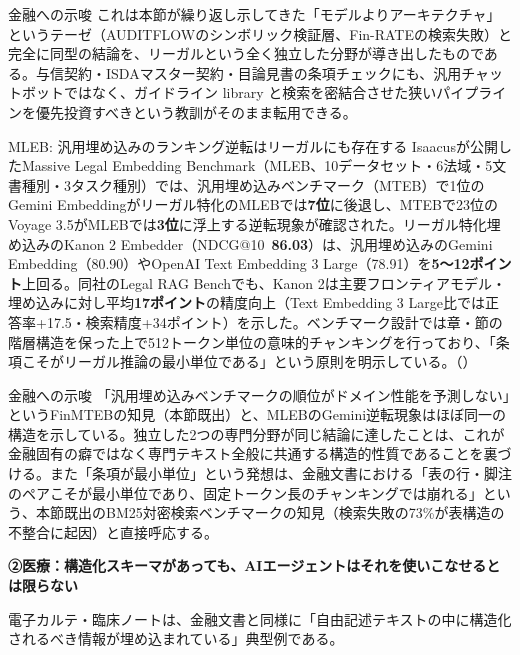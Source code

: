 \begin{insight}{金融への示唆}
これは本節が繰り返し示してきた「モデルよりアーキテクチャ」というテーゼ（AUDITFLOWのシンボリック検証層、Fin-RATEの検索失敗）と完全に同型の結論を、リーガルという全く独立した分野が導き出したものである。与信契約・ISDAマスター契約・目論見書の条項チェックにも、汎用チャットボットではなく、ガイドライン library と検索を密結合させた狭いパイプラインを優先投資すべきという教訓がそのまま転用できる。
\end{insight}

\begin{casestudy}{MLEB: 汎用埋め込みのランキング逆転はリーガルにも存在する}
Isaacusが公開したMassive Legal Embedding Benchmark（MLEB、10データセット・6法域・5文書種別・3タスク種別）では、汎用埋め込みベンチマーク（MTEB）で1位のGemini Embeddingがリーガル特化のMLEBでは\textbf{7位}に後退し、MTEBで23位のVoyage 3.5がMLEBでは\textbf{3位}に浮上する逆転現象が確認された。リーガル特化埋め込みのKanon 2 Embedder（NDCG@10\ \textbf{86.03}）は、汎用埋め込みのGemini Embedding（80.90）やOpenAI Text Embedding 3 Large（78.91）を\textbf{5〜12ポイント}上回る。同社のLegal RAG Benchでも、Kanon 2は主要フロンティアモデル・埋め込みに対し平均\textbf{17ポイント}の精度向上（Text Embedding 3 Large比では正答率+17.5・検索精度+34ポイント）を示した。ベンチマーク設計では章・節の階層構造を保った上で512トークン単位の意味的チャンキングを行っており、「条項こそがリーガル推論の最小単位である」という原則を明示している。（\cite{y02mleb2025,y02legalragbench2026}）
\end{casestudy}

\begin{insight}{金融への示唆}
「汎用埋め込みベンチマークの順位がドメイン性能を予測しない」というFinMTEBの知見（本節既出）と、MLEBのGemini逆転現象はほぼ同一の構造を示している。独立した2つの専門分野が同じ結論に達したことは、これが金融固有の癖ではなく専門テキスト全般に共通する構造的性質であることを裏づける。また「条項が最小単位」という発想は、金融文書における「表の行・脚注のペアこそが最小単位であり、固定トークン長のチャンキングでは崩れる」という、本節既出のBM25対密検索ベンチマークの知見（検索失敗の73\%が表構造の不整合に起因）と直接呼応する。
\end{insight}

\textbf{②医療：構造化スキーマがあっても、AIエージェントはそれを使いこなせるとは限らない}

電子カルテ・臨床ノートは、金融文書と同様に「自由記述テキストの中に構造化されるべき情報が埋め込まれている」典型例である。

